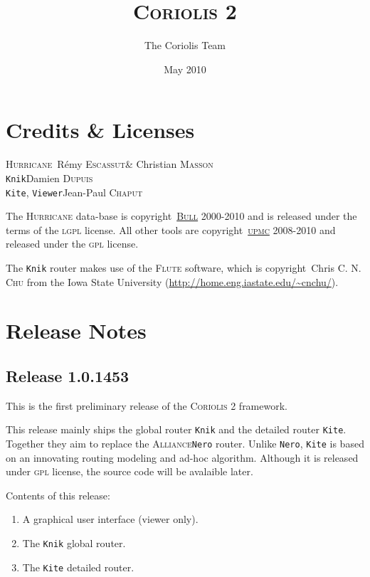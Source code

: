 \documentclass[11pt]{article}
\newcommand{\xhref}        [2]{\href{#2}{#1}}
\newcommand{\xhref}        [2]{\htmladdnormallink{#1}{#2}}
\newcommand {\Chu}                {\textsc{Chu}\xspace}
\newcommand {\Chaput}             {\textsc{Chaput}\xspace}
\newcommand {\Dupuis}             {\textsc{Dupuis}\xspace}
\newcommand {\Escassut}           {\textsc{Escassut}\xspace}
\newcommand {\Masson}             {\textsc{Masson}\xspace}
\newcommand {\LGPL}               {\textsc{lgpl}\xspace}
\newcommand {\GPL}                {\textsc{gpl}\xspace}
\newcommand {\Bull}               {\xhref{\textsc{Bull}}{http://www.bull.com/}\xspace}
\newcommand {\UPMC}               {\xhref{\textsc{upmc}}{http://www.upmc.fr/}\xspace}
\newcommand {\Flute}              {\textsc{Flute}\xspace}
\newcommand {\FluteRef}           {\xhref{http://home.eng.iastate.edu/\~{}cnchu/}%
                                      {http://home.eng.iastate.edu/~cnchu/}\xspace}
\newcommand {\Alliance}           {\textsc{Alliance}\xspace}
\newcommand {\Nero}               {\texttt{Nero}\xspace}
\newcommand {\CoriolisII}         {\textsc{Coriolis 2}\xspace}
\newcommand {\Hurricane}          {\textsc{Hurricane}\xspace}
\newcommand {\Knik}               {\texttt{Knik}\xspace}
\newcommand {\Kite}               {\texttt{Kite}\xspace}
\newcommand {\Viewer}             {\texttt{Viewer}\xspace}
\begin{document}
 \title{\CoriolisII}
 \author{The Coriolis Team}
 \date{May 2010}

 \maketitle

 \thispagestyle{fancy}

 \tableofcontents

 \section{Credits \& Licenses}

 \begin{center}
   \Hurricane     \dotfill\      Rémy \Escassut \& Christian \Masson   \\
   \Knik          \dotfill     Damien \Dupuis   \\
   \Kite, \Viewer \dotfill  Jean-Paul \Chaput   \\
 \end{center}

 The \Hurricane data-base is copyright\textcopyright\ \Bull 2000-2010 and is
 released under the terms of the \LGPL license. All other tools are
 copyright\textcopyright\ \UPMC 2008-2010 and released under the \GPL
 license. 

 The \Knik router makes use of the \Flute software, which is
 copyright\textcopyright\ Chris C. N. \Chu from the Iowa State University
 (\FluteRef).

 \newpage


 \section{Release Notes}

 \subsection{Release 1.0.1453}

 This is the first preliminary release of the \CoriolisII framework.

 This release mainly ships the global router \Knik and the detailed router
 \Kite. Together they aim to replace the \Alliance \Nero router.
 Unlike \Nero, \Kite is based on an innovating routing modeling and ad-hoc
 algorithm. Although it is released under \GPL license, the source code
 will be avalaible later.
 \medskip

 \noindent Contents of this release:
 \begin{enumerate}
   \item A graphical user interface (viewer only).
   \item The \Knik global router.
   \item The \Kite detailed router.
 \end{enumerate}
\end{document}
